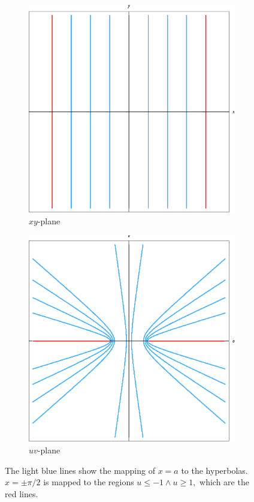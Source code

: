 \documentclass[12pt]{book}
\begin{document}
\begin{figure}[H]
    \centering
    \begin{subfigure}{0.45\textwidth}
        \centering
        \includegraphics[width = \textwidth]{./figs/chapter_2/sin_map_z.eps}
        \caption{$xy$-plane}
    \end{subfigure}
    \qquad
    \begin{subfigure}{0.45\textwidth}
        \centering
        \includegraphics[width = \textwidth]{./figs/chapter_2/sin_map_w.eps}
        \caption{$uv$-plane}
    \end{subfigure}
    \caption{The light blue lines show the mapping of $x = a$ to the hyperbolas. $x = \pm \pi / 2$ is mapped to the regions $u \leq -1 \land u \geq 1,$ which are the red lines.}
\end{figure}
\end{document}
